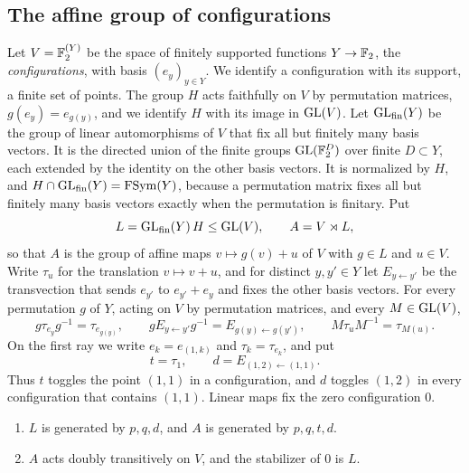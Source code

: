 \subsection{The affine group of configurations}\label{sec:group-affine}

Let $V=\mathbb F_2^{(Y)}$ be the space of finitely supported functions $Y\to\mathbb F_2$, the \emph{configurations}, with basis $(e_y)_{y\in Y}$. We
identify a configuration with its support, a finite set of points. The group $H$ acts faithfully on $V$ by permutation matrices,
$g(e_y)=e_{g(y)}$, and we identify $H$ with its image in $\operatorname{GL}(V)$. Let $\operatorname{GL}_{\rm fin}(Y)$ be the group of linear automorphisms of $V$ that
fix all but finitely many basis vectors. It is the directed union of the finite groups $\operatorname{GL}(\mathbb F_2^D)$ over finite $D\subset Y$, each extended
by the identity on the other basis vectors. It is normalized by $H$, and $H\cap\operatorname{GL}_{\rm fin}(Y)=\operatorname{FSym}(Y)$, because a permutation matrix
fixes all but finitely many basis vectors exactly when the permutation is finitary. Put
\[
L=\operatorname{GL}_{\rm fin}(Y)\,H\le\operatorname{GL}(V),\qquad A=V\rtimes L ,
\]
so that $A$ is the group of affine maps $v\mapsto g(v)+u$ of $V$ with $g\in L$ and $u\in V$. Write $\tau_u$ for the translation $v\mapsto
v+u$, and for distinct $y,y'\in Y$ let $E_{y\leftarrow y'}$ be the transvection that sends $e_{y'}$ to $e_{y'}+e_y$ and fixes the other
basis vectors. For every permutation $g$ of $Y$, acting on $V$ by permutation matrices, and every $M\in\operatorname{GL}(V)$,
\begin{equation}\label{eq:affine-id}
g\tau_{e_y}g^{-1}=\tau_{e_{g(y)}},\qquad gE_{y\leftarrow y'}g^{-1}=E_{g(y)\leftarrow g(y')},\qquad M\tau_uM^{-1}=\tau_{M(u)} .
\end{equation}
On the first ray we write $e_k=e_{(1,k)}$ and $\tau_k=\tau_{e_k}$, and put
\[
t=\tau_1,\qquad d=E_{(1,2)\leftarrow(1,1)} .
\]
Thus $t$ toggles the point $(1,1)$ in a configuration, and $d$ toggles $(1,2)$ in every configuration that contains $(1,1)$. Linear maps fix
the zero configuration $0$.

\begin{lemma}\label{lem:A-basic}
\leavevmode
\begin{enumerate}[label=(\alph*),itemsep=1pt]
\item $L$ is generated by $p,q,d$, and $A$ is generated by $p,q,t,d$.
\item $A$ acts doubly transitively on $V$, and the stabilizer of $0$ is $L$.
\end{enumerate}
\end{lemma}

